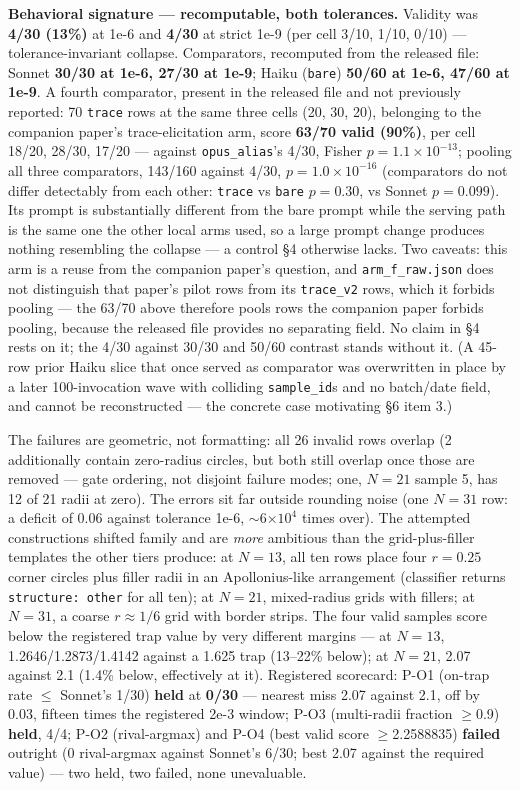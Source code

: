 \textbf{Behavioral signature --- recomputable, both tolerances.} Validity was \textbf{4/30 (13\%)} at 1e-6 and \textbf{4/30} at strict 1e-9 (per cell 3/10, 1/10, 0/10) --- tolerance-invariant collapse. Comparators, recomputed from the released file: Sonnet \textbf{30/30 at 1e-6, 27/30 at 1e-9}; Haiku (\texttt{bare}) \textbf{50/60 at 1e-6, 47/60 at 1e-9}. A fourth comparator, present in the released file and not previously reported: 70 \texttt{trace} rows at the same three cells (20, 30, 20), belonging to the companion paper's trace-elicitation arm, score \textbf{63/70 valid (90\%)}, per cell 18/20, 28/30, 17/20 --- against \texttt{opus\_alias}'s 4/30, Fisher $p = 1.1\times10^{-13}$; pooling all three comparators, 143/160 against 4/30, $p = 1.0\times10^{-16}$ (comparators do not differ detectably from each other: \texttt{trace} vs \texttt{bare} $p = 0.30$, vs Sonnet $p = 0.099$). Its prompt is substantially different from the bare prompt while the serving path is the same one the other local arms used, so a large prompt change produces nothing resembling the collapse --- a control \S4 otherwise lacks. Two caveats: this arm is a reuse from the companion paper's question, and \texttt{arm\_f\_raw.json} does not distinguish that paper's pilot rows from its \texttt{trace\_v2} rows, which it forbids pooling --- the 63/70 above therefore pools rows the companion paper forbids pooling, because the released file provides no separating field. No claim in \S4 rests on it; the 4/30 against 30/30 and 50/60 contrast stands without it. (A 45-row prior Haiku slice that once served as comparator was overwritten in place by a later 100-invocation wave with colliding \texttt{sample\_id}s and no batch/date field, and cannot be reconstructed --- the concrete case motivating \S6 item 3.)

The failures are geometric, not formatting: all 26 invalid rows overlap (2 additionally contain zero-radius circles, but both still overlap once those are removed --- gate ordering, not disjoint failure modes; one, $N = 21$ sample 5, has 12 of 21 radii at zero). The errors sit far outside rounding noise (one $N = 31$ row: a deficit of 0.06 against tolerance 1e-6, $\sim$6$\times10^{4}$ times over). The attempted constructions shifted family and are \emph{more} ambitious than the grid-plus-filler templates the other tiers produce: at $N = 13$, all ten rows place four $r = 0.25$ corner circles plus filler radii in an Apollonius-like arrangement (classifier returns \texttt{structure: other} for all ten); at $N = 21$, mixed-radius grids with fillers; at $N = 31$, a coarse $r \approx 1/6$ grid with border strips. The four valid samples score below the registered trap value by very different margins --- at $N = 13$, 1.2646/1.2873/1.4142 against a 1.625 trap (13--22\% below); at $N = 21$, 2.07 against 2.1 (1.4\% below, effectively at it). Registered scorecard: P-O1 (on-trap rate $\le$ Sonnet's 1/30) \textbf{held} at \textbf{0/30} --- nearest miss 2.07 against 2.1, off by 0.03, fifteen times the registered 2e-3 window; P-O3 (multi-radii fraction $\ge$0.9) \textbf{held}, 4/4; P-O2 (rival-argmax) and P-O4 (best valid score $\ge$2.2588835) \textbf{failed} outright (0 rival-argmax against Sonnet's 6/30; best 2.07 against the required value) --- two held, two failed, none unevaluable.

